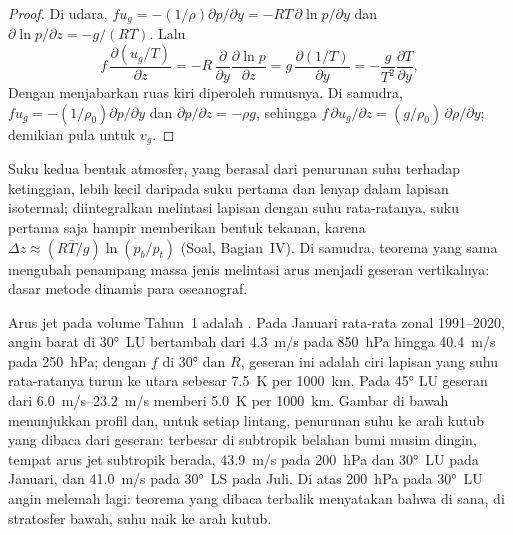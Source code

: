 \begin{proof}
Di udara, $fu_g = -(1/\rho)\partial p/\partial y = -RT\,\partial\ln
p/\partial y$ dan $\partial\ln p/\partial z = -g/(RT)$. Lalu
\[
f\,\frac{\partial(u_g/T)}{\partial z} = -R\,\frac{\partial}{\partial y}\frac{\partial\ln p}{\partial z}
= g\,\frac{\partial(1/T)}{\partial y} = -\frac{g}{T^2}\frac{\partial T}{\partial y} ,
\]
Dengan menjabarkan ruas kiri diperoleh rumusnya. Di samudra, $fu_g = -(1/\rho_0)\partial
p/\partial y$ dan $\partial p/\partial z = -\rho g$, sehingga $f\,\partial u_g/
\partial z = (g/\rho_0)\,\partial\rho/\partial y$; demikian pula untuk $v_g$.
\end{proof}

Suku kedua bentuk atmosfer, yang berasal dari penurunan suhu
terhadap ketinggian, lebih kecil daripada suku pertama dan lenyap dalam
lapisan isotermal; diintegralkan melintasi lapisan dengan suhu rata-ratanya, suku pertama
saja hampir memberikan bentuk tekanan, karena $\Delta z \approx (R\bar T/g)
\ln(p_b/p_t)$ (Soal, Bagian~IV). Di samudra, teorema yang sama mengubah
penampang massa jenis melintasi arus menjadi geseran vertikalnya: dasar
metode dinamis para oseanograf.


Arus jet pada volume Tahun~1 adalah . Pada Januari
rata-rata zonal 1991--2020, angin barat di \ang{30}~LU bertambah dari
\qty{4.3}{m/s} pada \qty{850}{hPa} hingga \qty{40.4}{m/s} pada \qty{250}{hPa}; dengan
$f$ di \ang{30} dan $R$, geseran ini adalah ciri lapisan yang suhu rata-ratanya
turun ke utara sebesar \qty{7.5}{K} per \qty{1000}{km}. Pada \ang{45}
LU geseran dari \qtyrange{6.0}{23.2}{m/s} memberi \qty{5.0}{K} per
\qty{1000}{km}. Gambar di bawah menunjukkan profil dan, untuk setiap lintang,
penurunan suhu ke arah kutub yang dibaca dari geseran: terbesar di
subtropik belahan bumi musim dingin, tempat arus jet subtropik
berada, \qty{43.9}{m/s} pada \qty{200}{hPa} dan \ang{30}~LU pada Januari, dan
\qty{41.0}{m/s} pada \ang{30}~LS pada Juli. Di atas \qty{200}{hPa} pada \ang{30}~LU
angin melemah lagi: teorema  yang dibaca terbalik menyatakan bahwa
di sana, di stratosfer bawah, suhu naik ke arah kutub.

